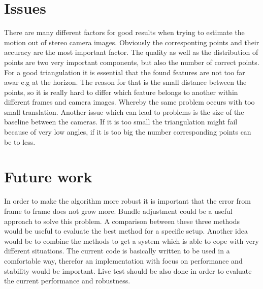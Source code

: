 \documentclass[11pt]{article}
\begin{document}
	\section{Issues}

	There are many different factors for good results when trying to estimate the motion out of stereo camera images. Obviously the corresponting points and their accuracy are the most important factor. The quality as well as the distribution of points are two very important components, but also the number of correct points. For a good triangulation it is essential that the found features are not too far awar e.g at the horizon. The reason for that is the small distance between the points, so it is really hard to differ which feature belongs to another within different frames and camera images. Whereby the same problem occurs with too small translation. Another issue which can lead to problems is the size of the baseline between the cameras. If it is too small the triangulation might fail because of very low angles, if it is too big the number corresponding points can be to less.
	
	
	\section{Future work}
	In order to make the algorithm more robust it is important that the error from frame to frame does not grow more. Bundle adjustment could be a useful approach to solve this problem. A comparison between these three methods would be useful to evaluate the best method for a specific setup. Another idea would be to combine the methods to get a system which is able to cope with very different situations. The current code is basically written to be used in a comfortable way, therefor an implementation with focus on performance and stability would be important. Live test should be also done in order to evaluate the current performance and robustness.
\end{document}
